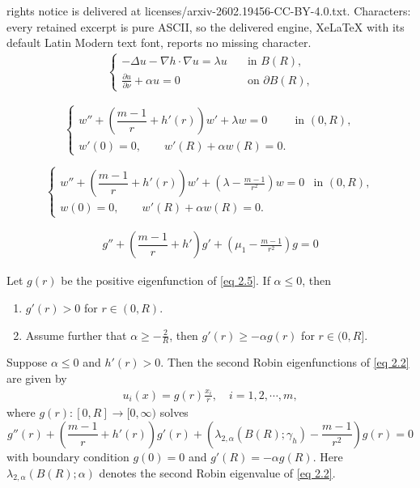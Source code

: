 \documentclass[10pt,a4paper]{amsart}
\def\a{\alpha}
\def\l{\lambda}
\def\p{\partial}
\begin{document}
rights notice is delivered at licenses/arxiv-2602.19456-CC-BY-4.0.txt. Characters: every retained excerpt is pure ASCII, so the delivered engine, XeLaTeX with its default Latin Modern text font, reports no missing character.
\begin{align}\label{eq 2.2}
\begin{cases}
    -\Delta u-\nabla h \cdot \nabla u=\l u \quad & \text{in $B(R)$,}\\
\frac{\p u}{\p \nu}+\a u=0 \quad & \text{on $\p B(R)$,}
\end{cases}
\end{align}

\begin{equation} \label{eq 2.4}
\begin{cases}
w'' + \left( \dfrac{m-1}{r} + h'(r) \right)w' +\l w=0 & \text{in } (0,R), \\
w'(0) =0, \qquad  w'(R)+\alpha w(R) = 0.
\end{cases}
\end{equation}

\begin{equation} \label{eq 2.5}
\begin{cases}
w'' + \left( \dfrac{m-1}{r} + h'(r) \right)w' + (\l-\frac {m-1} {r^2}) w = 0 & \text{in } (0,R), \\
w(0)=0, \qquad  w'(R)+\alpha w(R) = 0.
\end{cases}
\end{equation}

\begin{align}\label{eq 2.7}
   g'' + \left( \dfrac{m-1}{r} + h' \right)g' + (\mu_1-\frac {m-1} {r^2}) g = 0 
\end{align}

\begin{proposition}\label{prop 2.2}
Let $g(r)$ be the  positive  eigenfunction of \eqref{eq 2.5}. If $\a\le 0$, then
\begin{enumerate}
\item $g'(r)>0$ for $r\in (0, R)$.
\item Assume further that $\a\ge -\frac 2 R$, then  $g'(r)\ge  -\a g(r)$ for $r\in (0, R]$.
\end{enumerate}
\end{proposition}

\begin{proposition}\label{prop 2.3}
Suppose $\a\le 0$ and $h'(r)>0$. Then the second Robin eigenfunctions of \eqref{eq 2.2} are given by 
\begin{align*}
u_i(x)=g(r) \frac{x_i}{r},\quad  i=1,2, \cdots,m,
\end{align*}
where $g(r):[0, R]\rightarrow [0,\infty)$ solves  
\begin{equation}\label{eq 2.11}
g''(r)+(\frac {m-1} {r}+h'(r)) g'(r)+\left(\l_{2,\a}(B(R); \gamma_h)-\frac {m-1} {r^2}\right) g(r)=0
\end{equation}
with boundary condition $g(0)=0$ and $g'(R)=-\a g(R)$. Here $\l_{2, \a}(B(R);\a)$ denotes the second Robin eigenvalue of \eqref{eq 2.2}. 
\end{proposition}
\end{document}
